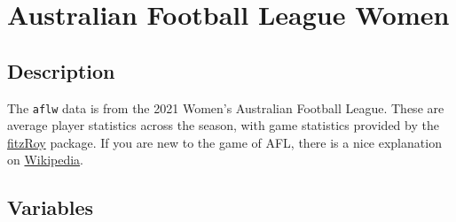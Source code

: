 \documentclass[
  letterpaper,
]{krantz}
\begin{document}
\section{Australian Football League
Women}\label{australian-football-league-women}

\subsection*{Description}\label{description}

The \texttt{aflw} data is from the 2021 Women's Australian Football
League. These are average player statistics across the season, with game
statistics provided by the
\href{https://jimmyday12.github.io/fitzRoy/}{fitzRoy} package. If you
are new to the game of AFL, there is a nice explanation on
\href{https://en.wikipedia.org/wiki/Women\%27s_Australian_rules_football}{Wikipedia}.

\subsection*{Variables}\label{variables}
\end{document}
